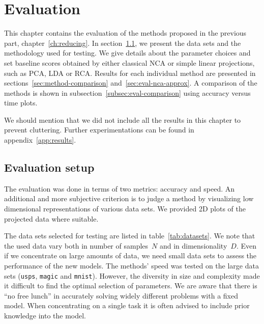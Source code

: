 \chapter{Evaluation}
\label{ch:evaluation}

This chapter contains the evaluation of the methods proposed in the previous part, chapter~\ref{ch:reducing}. In section~\ref{sec:setup}, we present the data sets and the methodology used for testing. We give details about the parameter choices and set baseline scores obtained by either classical NCA or simple linear projections, such as PCA, LDA or RCA. Results for each individual method are presented in sections~\ref{sec:method-comparison} and~\ref{sec:eval-nca-approx}. A comparison of the methods is shown in subsection~\ref{subsec:eval-comparison} using accuracy versus time plots.

We should mention that we did not include all the results in this chapter to prevent cluttering. Further experimentations can be found in appendix~\ref{app:results}.

\section{Evaluation setup}
\label{sec:setup}

The evaluation was done in terms of two metrics: accuracy and speed. An additional and more subjective criterion is to judge a method by visualizing low dimensional representations of various data sets. We provided 2D plots of the projected data where suitable.

The data sets selected for testing are listed in table~\ref{tab:datasets}. We note that the used data vary both in number of samples~$N$ and in dimensionality~$D$. Even if we concentrate on large amounts of data, we need small data sets to assess the performance of the new models. The methods' speed was tested on the large data sets (\texttt{usps}, \texttt{magic} and \texttt{mnist}). However, the diversity in size and complexity made it difficult to find the optimal selection of parameters. We are aware that there is ``no free lunch'' in accurately solving widely different problems with a fixed model. When concentrating on a single task it is often advised to include prior knowledge into the model. 

